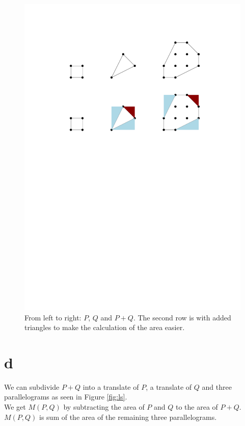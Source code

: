 \documentclass[paper=a4, fontsize=11pt]{scrartcl} %
\theoremstyle{plain}
\begin{document}
\begin{figure}[htbp]
   \centering
   \includegraphics{Images/ConvexLattice.pdf} %
   \caption{From left to right: $P$, $Q$ and $P+Q$. The second row is with added triangles to make the calculation of the area easier.}
   \label{fig:cl}
\end{figure}
\section{d}

We can subdivide $P+Q$ into a translate of $P$, a translate of $Q$ and three parallelograms as seen in Figure \ref{fig:ls}.\\

We get $M(P,Q)$ by subtracting the area of $P$ and $Q$ to the area of $P+Q$. $M(P,Q)$ is sum of the area of the remaining three parallelograms.
\end{document}

